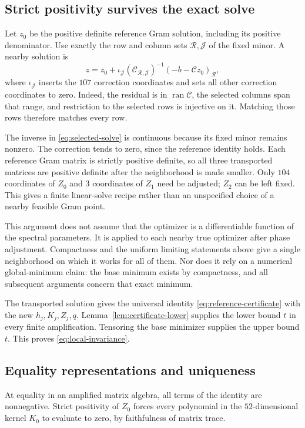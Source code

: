 \documentclass[11pt]{article}
\theoremstyle{remark}\newtheorem{remark}[theorem]{Remark}
\newcommand{\ran}{\operatorname{ran}}
\newcommand{\calC}{\mathcal C}
\begin{document}
\subsection{Strict positivity survives the exact solve}
Let $z_0$ be the positive definite reference Gram solution, including its positive denominator. Use exactly the row and column sets $\mathcal R,\mathcal J$ of the fixed minor. A nearby solution is
\begin{equation}\label{eq:selected-solve}
 z=z_0+\iota_{\mathcal J}
  (\calC_{\mathcal R,\mathcal J})^{-1}
  (-b-\calC z_0)_{\mathcal R},
\end{equation}
where $\iota_{\mathcal J}$ inserts the $107$ correction coordinates and sets all other correction coordinates to zero. Indeed, the residual is in $\ran\calC$, the selected columns span that range, and restriction to the selected rows is injective on it. Matching those rows therefore matches every row.

The inverse in \eqref{eq:selected-solve} is continuous because its fixed minor remains nonzero. The correction tends to zero, since the reference identity holds. Each reference Gram matrix is strictly positive definite, so all three transported matrices are positive definite after the neighborhood is made smaller. Only $104$ coordinates of $Z_0$ and $3$ coordinates of $Z_1$ need be adjusted; $Z_2$ can be left fixed. This gives a finite linear-solve recipe rather than an unspecified choice of a nearby feasible Gram point.

This argument does not assume that the optimizer is a differentiable function of the spectral parameters. It is applied to each nearby true optimizer after phase adjustment. Compactness and the uniform limiting statements above give a single neighborhood on which it works for all of them. Nor does it rely on a numerical global-minimum claim: the base minimum exists by compactness, and all subsequent arguments concern that exact minimum.

The transported solution gives the universal identity \eqref{eq:reference-certificate} with the new $h_j,K_j,Z_j,q$. Lemma~\ref{lem:certificate-lower} supplies the lower bound $t$ in every finite amplification. Tensoring the base minimizer supplies the upper bound $t$. This proves \eqref{eq:local-invariance}.

\subsection{Equality representations and uniqueness}
At equality in an amplified matrix algebra, all terms of the identity are nonnegative. Strict positivity of $Z_0$ forces every polynomial in the $52$-dimensional kernel $K_0$ to evaluate to zero, by faithfulness of matrix trace.
\end{document}
